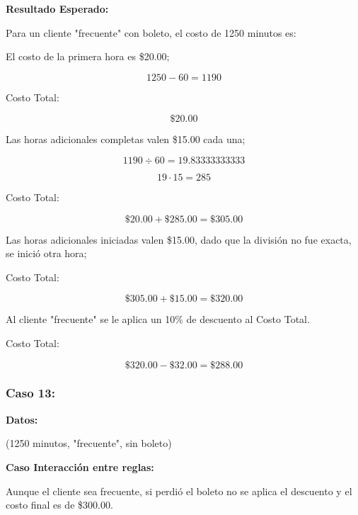 \documentclass[11pt,letterpaper]{article}
\begin{document}
\textbf{Resultado Esperado:}

Para un cliente "frecuente" con boleto, el costo de 1250 minutos es:

El costo de la primera hora es \$20.00;

\[
   1250 - 60 = 1190
\]



Costo Total:

\[
   \text{\$}20.00
\]

\vspace{\baselineskip}
\vspace{\baselineskip}
\vspace{\baselineskip}
\vspace{\baselineskip}

Las horas adicionales completas valen \$15.00 cada una;

\[
   1190 \div 60 = 19.83333333333
\]

\[
   19 \cdot 15 = 285
\]



Costo Total:

\[
   \text{\$}20.00 + \text{\$}285.00 = \text{\$}305.00
\]

Las horas adicionales iniciadas valen \$15.00, dado que la división no fue exacta, se inició otra hora;



Costo Total:

\[
   \text{\$}305.00 + \text{\$}15.00 = \text{\$}320.00
\]

Al cliente "frecuente" se le aplica un 10\% de descuento al Costo Total.



Costo Total:

\[
   \text{\$}320.00 - \text{\$}32.00 = \text{\$}288.00
\]


\subsubsection{Caso 13:}
\label{sec:org708c4c3}

\textbf{Datos:}

(1250 minutos, "frecuente", sin boleto)

\textbf{Caso Interacción entre reglas:}

Aunque el cliente sea frecuente, si perdió el boleto no se aplica el descuento y el costo final es de \$300.00.
\end{document}
